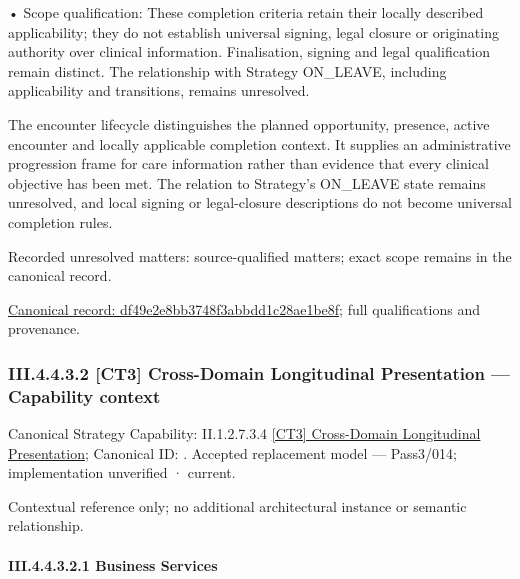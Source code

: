 •
Scope qualification: These completion criteria retain their locally described applicability; they do not establish universal signing, legal closure or originating authority over clinical information. Finalisation, signing and legal qualification remain distinct. The relationship with Strategy ON\_LEAVE, including applicability and transitions, remains unresolved.



The encounter lifecycle distinguishes the planned opportunity, presence, active encounter and locally applicable completion context. It supplies an administrative progression frame for care information rather than evidence that every clinical objective has been met. The relation to Strategy's ON\_LEAVE state remains unresolved, and local signing or legal-closure descriptions do not become universal completion rules.


{\small Recorded unresolved matters: source-qualified matters; exact scope remains in the canonical record.}\par
{\footnotesize \href{../../../../continuum/business/business-process/df49e2e8bb3748f3abbdd1c28ae1be8f.md}{Canonical record: df49e2e8bb3748f3abbdd1c28ae1be8f}; full qualifications and provenance.}\par
\subsubsection*{III.4.4.3.2 [CT3] Cross-Domain Longitudinal Presentation — Capability context}
\label{navigation:III.4.4.3.2}

{\small Canonical Strategy Capability: II.1.2.7.3.4 \hyperref[element:81161f005d8f40c8a552e1138c192819]{[CT3] Cross-Domain Longitudinal Presentation}; Canonical ID: \texttt{}. Accepted replacement model — Pass3/014; implementation unverified · current.}\par
Contextual reference only; no additional architectural instance or semantic relationship.\par
\paragraph*{III.4.4.3.2.1 Business Services}
\label{navigation:III.4.4.3.2.1}

